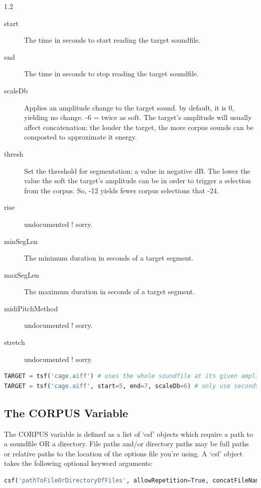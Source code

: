 \documentclass{article}
\begin{document}
\begin{spacing}{1.2}
\begin{description}
\item[start] The time in seconds to start reading the target soundfile.
\item[end] The time in seconds to stop reading the target soundfile.  
\item[scaleDb] Applies an amplitude change to the target sound. by default, it is 0, yielding no change. -6 = twice as soft.  The target's amplitude will usually affect concatenation: the louder the target, the more corpus sounds can be composted to approximate it energy.
\item[thresh] Set the threshold for segmentation: a value in negative dB.  The lower the value the soft the target's amplitude can be in order to trigger a selection from the corpus.  So, -12 yields fewer corpus selections that -24.
\item[rise] undocumented !  sorry.
\item[minSegLen] The minimum duration in seconds of a target segment.
\item[maxSegLen] The maximum duration in seconds of a target segment.
\item[midiPitchMethod] undocumented !  sorry.
\item[stretch] undocumented !  sorry.
\end{description}

\begin{lstlisting}[language=python]
TARGET = tsf('cage.aiff') # uses the whole soundfile at its given amplitude
TARGET = tsf('cage.aiff', start=5, end=7, scaleDb=6) # only use seconds 5-7 of cage.aiff at double the amplitude.
\end{lstlisting}


\subsection{The CORPUS Variable}
The CORPUS variable is defined as a list of `csf' objects which require a path to a soundfile OR a directory.  File paths and/or directory paths may be full paths or relative paths to the location of the options file you're using.  A `csf' object takes the following optional keyword arguments:

\begin{lstlisting}[language=python]
csf('pathToFileOrDirectoryOfFiles', allowRepetition=True, concatFileName=None,  end=None,  envelopeSlope=1,  excludeStr=None,  excludeTimes=[], hasParams=False, includeStr=None,  includeTimes=[],  limit={},  limitDur=None,  midiPitchMethod='composite',  offsetLen='30\%',  onsetLen=0.01,  recursive=True,  restrictInTime=0,  restrictOverlaps=None,  restrictRepetition=0.1,  scaleDb=0.0,  scaleDistance=1,  postSelectAmpBool=False, postSelectAmpMin=-12, postSelectAmpMax=+12, postSelectAmpMethod='power-mean-seg', segmentationExtension='.txt',  segmentationFile=None,  start=None,  superimposeRule=None,  transMethod=None,  transQuantize=0,  wholeFile=False, MWinstrName=None,  MWtext=None, MWnotehead='.')
\end{lstlisting}



\end{spacing}
\end{document}
